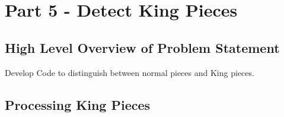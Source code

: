 \documentclass[12pt]{article}
\begin{document}
    \newpage
    \section{Part 5 - Detect King Pieces}
    \subsection{High Level Overview of Problem Statement}
    \par
    Develop Code to distinguish between normal pieces and King pieces.

    \subsection{Processing King Pieces}
    \par
    
\end{document}
